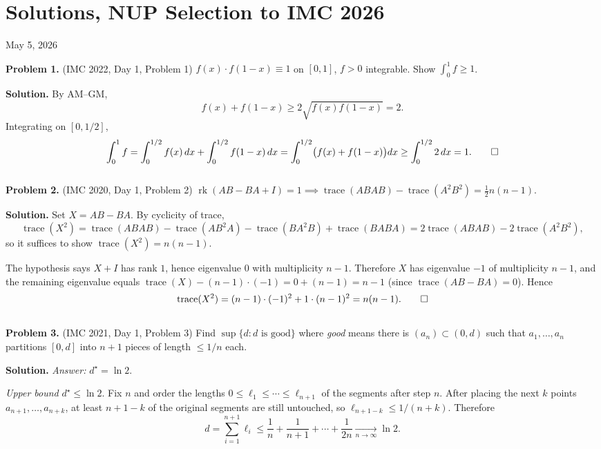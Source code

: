 \documentclass{article}
\newcommand{\tr}{\operatorname{trace}}
\begin{document}
\pagestyle{plain}

\section*{Solutions, NUP Selection to IMC 2026}

\begin{center}
May 5, 2026
\end{center}

\textbf{Problem 1.} (IMC 2022, Day 1, Problem 1)
\( f(x) \cdot f(1{-}x) \equiv 1 \) on \( [0,1] \), \( f > 0 \) integrable. Show \( \int_{0}^{1} f \geq 1 \).

\textbf{Solution.} By AM--GM,
\[
f(x) + f(1-x) \geq 2\sqrt{f(x) f(1-x)} = 2.
\]
Integrating on \( [0, 1/2] \),
\[
\int_{0}^{1} f
= \int_{0}^{1/2} f(x)\, dx + \int_{0}^{1/2} f(1-x)\, dx
= \int_{0}^{1/2} \bigl(f(x) + f(1-x)\bigr) dx \geq \int_{0}^{1/2} 2\, dx = 1. \qed
\]
\\

\textbf{Problem 2.} (IMC 2020, Day 1, Problem 2)
\( \operatorname{rk}(AB - BA + I) = 1 \implies \tr(ABAB) - \tr(A^2 B^2) = \tfrac{1}{2} n(n-1) \).

\textbf{Solution.}
Set \( X = AB - BA \). By cyclicity of trace,
\[
\tr(X^2) = \tr(ABAB) - \tr(AB^2 A) - \tr(BA^2 B) + \tr(BABA)
= 2\tr(ABAB) - 2\tr(A^2 B^2),
\]
so it suffices to show \( \tr(X^2) = n(n-1) \).

The hypothesis says \( X + I \) has rank \( 1 \), hence eigenvalue \( 0 \) with multiplicity \( n - 1 \). Therefore \( X \) has eigenvalue \( -1 \) of multiplicity \( n - 1 \), and the remaining eigenvalue equals \( \tr(X) - (n-1)\cdot(-1) = 0 + (n-1) = n - 1 \) (since \( \tr(AB - BA) = 0 \)). Hence
\[
\tr(X^2) = (n-1) \cdot (-1)^2 + 1 \cdot (n-1)^2 = n(n-1). \qed
\]
\\

\textbf{Problem 3.} (IMC 2021, Day 1, Problem 3)
Find \( \sup\{d : d \text{ is good}\} \) where \emph{good} means there is \( (a_n) \subset (0, d) \) such that \( a_1, \ldots, a_n \) partitions \( [0, d] \) into \( n+1 \) pieces of length \( \leq 1/n \) each.

\textbf{Solution.} \textit{Answer:} \( d^{\star} = \ln 2 \).

\emph{Upper bound} \( d^{\star} \leq \ln 2 \). Fix \( n \) and order the lengths \( 0 \leq \ell_1 \leq \cdots \leq \ell_{n+1} \) of the segments after step \( n \). After placing the next \( k \) points \( a_{n+1}, \ldots, a_{n+k} \), at least \( n + 1 - k \) of the original segments are still untouched, so \( \ell_{n+1-k} \leq 1/(n+k) \). Therefore
\[
d = \sum_{i=1}^{n+1} \ell_i \leq \frac{1}{n} + \frac{1}{n+1} + \cdots + \frac{1}{2n} \xrightarrow[n \to \infty]{} \ln 2.
\]
\end{document}
